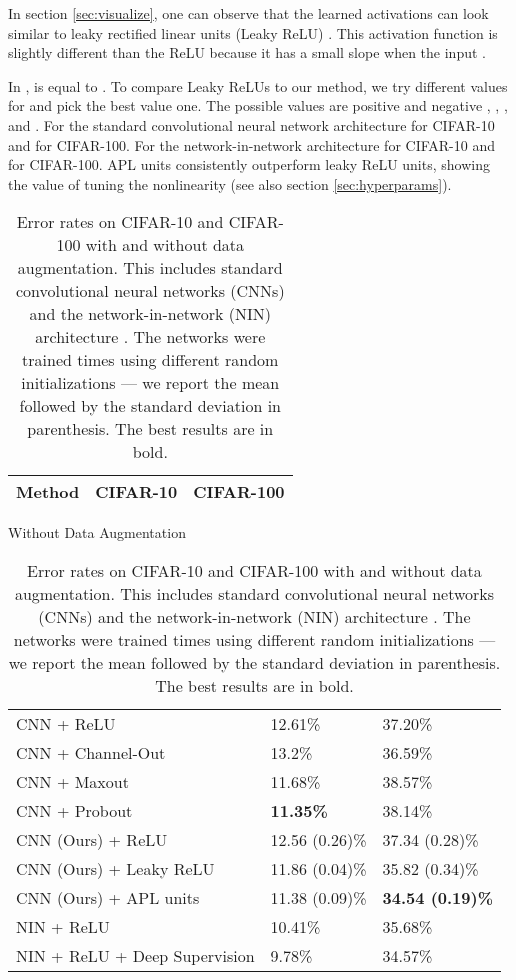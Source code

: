 \documentclass{article} \usepackage{iclr2015,times}
\begin{document}
In section \ref{sec:visualize}, one can observe that the learned activations can look similar to leaky rectified linear units (Leaky ReLU) \citep{maas2013rectifier}. This activation function is slightly different than the ReLU because it has a small slope  when the input .


In \citep{maas2013rectifier},  is equal to . To compare Leaky ReLUs to our method, we try different values for  and pick the best value one. The possible values are positive and negative , , , and . For the standard convolutional neural network architecture  for CIFAR-10 and  for CIFAR-100. For the network-in-network architecture  for CIFAR-10 and  for CIFAR-100.
APL units consistently outperform leaky ReLU units, showing the value of tuning the nonlinearity (see also section \ref{sec:hyperparams}).

\begin{table}[h]
\caption{Error rates on CIFAR-10 and CIFAR-100 with and without data augmentation. This includes standard convolutional neural networks (CNNs) and the network-in-network (NIN) architecture \citep{lin2013network}. The networks were trained  times using different random initializations --- we report the mean followed by the standard deviation in parenthesis. The best results are in bold.}
\label{cifar_table}
\begin{center}
\begin{tabular}{p{8.4cm}p{2.2cm}p{2.2cm}}
\bf Method  &\bf CIFAR-10 & \bf CIFAR-100\\
\hline
\end{tabular}
Without Data Augmentation
\begin{tabular}{p{8.4cm}p{2.2cm}p{2.2cm}}
\hline
CNN + ReLU \citep{srivastava2014dropout} & 12.61\% & 37.20\%\\
CNN + Channel-Out \citep{wang2013maxout} & 13.2\% & 36.59\% \\
CNN + Maxout \citep{goodfellow2013maxout} & 11.68\% & 38.57\% \\
CNN + Probout \citep{springenberg2013improving} & \bf11.35\% & 38.14\% \\
CNN (Ours) + ReLU & 12.56 (0.26)\%  & 37.34 (0.28)\%  \\
CNN (Ours) + Leaky ReLU & 11.86 (0.04)\% & 35.82 (0.34)\% \\
CNN (Ours) + APL units  & 11.38 (0.09)\% &\bf34.54 (0.19)\%  \\
\hline
NIN + ReLU \citep{lin2013network} & 10.41\% & 35.68\% \\
NIN + ReLU + Deep Supervision \citep{lee2014deeply} & 9.78\% & 34.57\% \\

\end{tabular}
\end{center}
\end{table}
\end{document}
